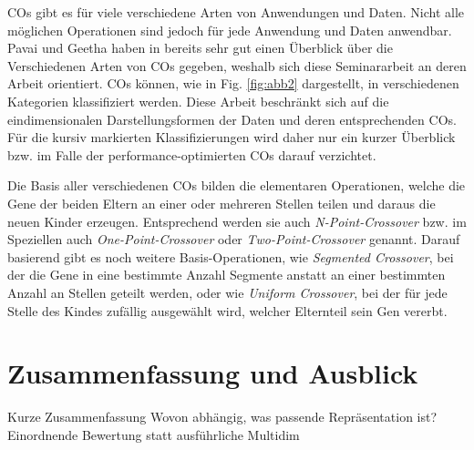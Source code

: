 \documentclass{llncs}
\begin{document}
COs gibt es für viele verschiedene Arten von Anwendungen und Daten. Nicht alle möglichen Operationen sind jedoch für jede Anwendung und Daten anwendbar. Pavai und Geetha haben in \cite{Survey} bereits sehr gut einen Überblick über die Verschiedenen Arten von COs gegeben, weshalb sich diese Seminararbeit an deren Arbeit orientiert. COs können, wie in Fig. \ref{fig:abb2} dargestellt, in verschiedenen Kategorien klassifiziert werden. Diese Arbeit beschränkt sich auf die eindimensionalen Darstellungsformen der Daten und deren entsprechenden COs. Für die kursiv markierten Klassifizierungen wird daher nur ein kurzer Überblick bzw. im Falle der performance-optimierten COs darauf verzichtet.

Die Basis aller verschiedenen COs bilden die elementaren Operationen, wel\-che die Gene der beiden Eltern an einer oder mehreren Stellen teilen und daraus die neuen Kinder erzeugen. Entsprechend werden sie auch \textit{N-Point-Crossover} bzw. im Speziellen auch \textit{One-Point-Crossover} oder \textit{Two-Point-Crossover} ge\-nannt. Darauf basierend gibt es noch weitere Basis-Operationen, wie \textit{Segmented Cross\-over}, bei der die Gene in eine bestimmte Anzahl Segmente anstatt an einer bestimmten Anzahl an Stellen geteilt werden, \cite{GABasicIdeas} oder wie \textit{Uniform Crossover}, bei der für jede Stelle des Kindes zufällig ausgewählt wird, welcher Elternteil sein Gen vererbt.



\section{Zusammenfassung und Ausblick}
\label{sec:ZusFass}

	Kurze Zusammenfassung
	Wovon abhängig, was passende Repräsentation ist?
	Einordnende Bewertung statt ausführliche Multidim

 

\end{document}
